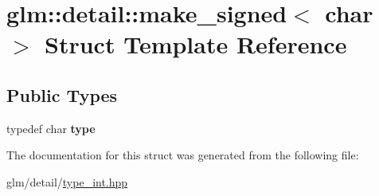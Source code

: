 \hypertarget{structglm_1_1detail_1_1make__signed_3_01char_01_4}{\section{glm\-:\-:detail\-:\-:make\-\_\-signed$<$ char $>$ Struct Template Reference}
\label{structglm_1_1detail_1_1make__signed_3_01char_01_4}
}
\subsection*{Public Types}
\begin{DoxyCompactItemize}
\item 
\hypertarget{structglm_1_1detail_1_1make__signed_3_01char_01_4_ad92111512e0af83393df0905896d478f}{typedef char {\bfseries type}}\label{structglm_1_1detail_1_1make__signed_3_01char_01_4_ad92111512e0af83393df0905896d478f}

\end{DoxyCompactItemize}


The documentation for this struct was generated from the following file\-:\begin{DoxyCompactItemize}
\item 
glm/detail/\hyperlink{type__int_8hpp}{type\-\_\-int.\-hpp}\end{DoxyCompactItemize}
